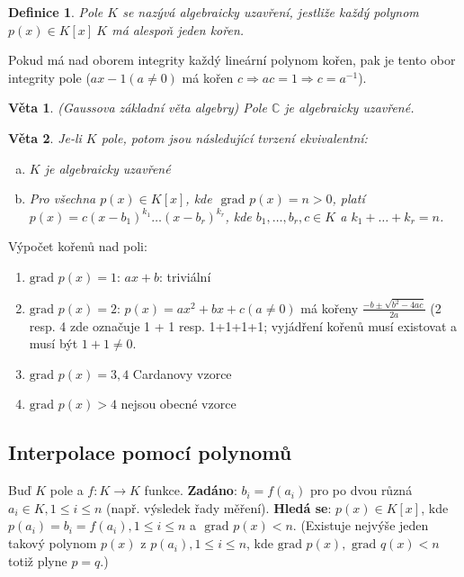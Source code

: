 \documentclass[a4paper, 11pt]{report}
\newtheorem{mydef}{Definice}[chapter]
\newtheorem{veta}{Věta}
\begin{document}
\begin{mydef}
Pole $K$ se nazývá algebraicky uzavření, jestliže každý polynom $p(x) \in K[x] \ K$ má alespoň jeden kořen.
\end{mydef}
Pokud má nad oborem integrity každý lineární polynom kořen, pak je tento obor integrity pole ($ax - 1 (a \not=0)$ má kořen $c \Rightarrow ac = 1 \Rightarrow c = a^{-1}$).

\begin{veta}
(Gaussova základní věta algebry) Pole $\mathbb{C}$ je algebraicky uzavřené.
\end{veta}

\begin{veta}
Je-li $K$ pole, potom jsou následující tvrzení ekvivalentní:
\begin{enumerate}[a)]
	\item $K$ je algebraicky uzavřené
	\item Pro všechna $p(x) \in K[x]$, kde $\text{ grad } p(x) = n > 0$, platí $p(x) = c(x - b_1)^{k_1} \dots (x - b_r)^{k_r}$, kde $b_1, \dots, b_r, c \in K$ a $k_1 + \dots + k_r = n$.
\end{enumerate}
\end{veta}

Výpočet kořenů nad poli:
\begin{enumerate}[1)]
	\item $\text{grad } p(x) = 1$: $ax + b$:  triviální
	\item $\text{grad } p(x) = 2$: $p(x) = ax^2 + bx + c (a \not= 0)$ má kořeny $\frac{-b \pm \sqrt{b^2 - 4ac}}{2a}$ (2 resp. 4 zde označuje 1 + 1 resp. 1+1+1+1; vyjádření kořenů musí existovat a musí být $1+1 \not= 0$.
	\item $\text{grad } p(x) = 3, 4$ Cardanovy vzorce
	\item $\text{grad } p(x) > 4$  nejsou obecné vzorce
\end{enumerate}

\subsection{Interpolace pomocí polynomů}
Buď $K$ pole a $f: K \to K$ funkce. \textbf{Zadáno}: $b_i = f(a_i)$  pro po dvou různá $a_i \in K, 1 \leq i \leq n$ (např. výsledek řady měření). \textbf{Hledá se}: $p(x) \in K[x]$, kde $p(a_i) = b_i = f(a_i), 1 \leq i \leq n$ a $\text{ grad } p(x) < n$. (Existuje nejvýše jeden takový polynom $p(x)$ z $p(a_i), 1 \leq i \leq n$, kde $\text{grad } p(x), \text{ grad } q(x) < n$ totiž plyne $p = q$.)
\end{document}
